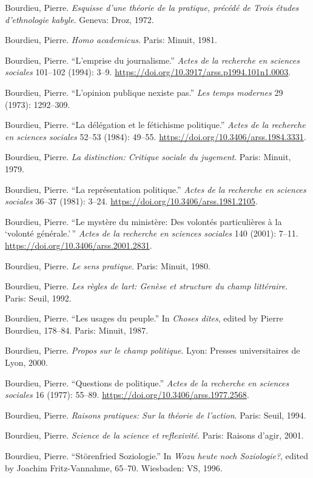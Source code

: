 \documentclass{tufte-handout}
\begin{document}
\begin{hangparas}{.25in}{1}
Bourdieu, Pierre. \emph{Esquisse d'une théorie de la pratique, précédé
de Trois études d'ethnologie kabyle}. Geneva: Droz, 1972.

Bourdieu, Pierre. \emph{Homo academicus}. Paris: Minuit, 1981.

Bourdieu, Pierre. ``L'emprise du journalisme.'' \emph{Actes de la
recherche en sciences sociales} 101--102 (1994): 3--9.
\url{https://doi.org/10.3917/arss.p1994.101n1.0003}.

Bourdieu, Pierre. ``L'opinion publique n\textquotesingle existe pas.''
\emph{Les temps modernes} 29 (1973): 1292--309.

Bourdieu, Pierre. ``La délégation et le fétichisme politique.''
\emph{Actes de la recherche en sciences sociales} 52--53 (1984): 49--55.
\url{https://doi.org/10.3406/arss.1984.3331}.

Bourdieu, Pierre. \emph{La distinction: Critique sociale du jugement}.
Paris: Minuit, 1979.

Bourdieu, Pierre. ``La représentation politique.'' \emph{Actes de la
recherche en sciences sociales} 36--37 (1981): 3--24.
\url{https://doi.org/10.3406/arss.1981.2105}.

Bourdieu, Pierre. ``Le mystère du ministère: Des volontés particulières
à la `volonté générale.'\,'' \emph{Actes de la recherche en sciences
sociales} 140 (2001): 7--11.
\url{https://doi.org/10.3406/arss.2001.2831}.

Bourdieu, Pierre. \emph{Le sens pratique}. Paris: Minuit, 1980.

Bourdieu, Pierre. \emph{Les règles de l\textquotesingle art: Genèse et
structure du champ littéraire}. Paris: Seuil, 1992.

Bourdieu, Pierre. ``Les usages du peuple.'' In \emph{Choses dites},
edited by Pierre Bourdieu, 178--84. Paris: Minuit, 1987.

Bourdieu, Pierre. \emph{Propos sur le champ politique}. Lyon: Presses
universitaires de Lyon, 2000.

Bourdieu, Pierre. ``Questions de politique.'' \emph{Actes de la
recherche en sciences sociales} 16 (1977): 55--89.
\url{https://doi.org/10.3406/arss.1977.2568}.

Bourdieu, Pierre. \emph{Raisons pratiques: Sur la théorie de l'action}.
Paris: Seuil, 1994.

Bourdieu, Pierre. \emph{Science de la science et reflexivité}. Paris:
Raisons d'agir, 2001.

Bourdieu, Pierre. ``Störenfried Soziologie.'' In \emph{Wozu heute noch
Soziologie?}, edited by Joachim Fritz-Vannahme, 65--70. Wiesbaden: VS,
1996.


\end{hangparas}
\end{document}
